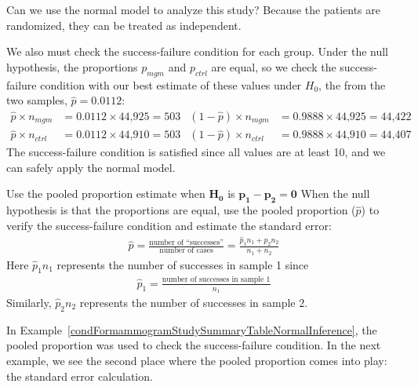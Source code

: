 \begin{examplewrap}
\begin{nexample}{Can we use the normal model to analyze this study?}\label{condFormammogramStudySummaryTableNormalInference}
Because the patients are randomized, they can be treated as independent.

We also must check the success-failure condition for each group. Under the null hypothesis, the proportions $p_{mgm}$ and $p_{ctrl}$ are equal, so we check the success-failure condition with our best estimate of these values under $H_0$, the  from the two samples, $\hat{p} = 0.0112$:
\begin{align*}
\hat{p} \times n_{mgm} &= 0.0112 \times \text{44,925} = 503
	& (1 - \hat{p}) \times n_{mgm} &= 0.9888 \times \text{44,925} = \text{44,422} \\
\hat{p} \times n_{ctrl} &= 0.0112 \times \text{44,910} = 503
	& (1 - \hat{p}) \times n_{ctrl} &= 0.9888 \times \text{44,910} = \text{44,407}
\end{align*}
The success-failure condition is satisfied since all values are at least 10, and we can safely apply the normal model.
\end{nexample}
\end{examplewrap}

\begin{onebox}{Use the pooled proportion estimate when $\mathbf{H_0}$ is $\mathbf{p_1 - p_2 = 0}$}
  When the null hypothesis is that the proportions are equal,
  use the pooled proportion ($\hat{p}$) to verify the
  success-failure condition and estimate the standard error:
  \begin{eqnarray*}
  \hat{p} = \frac{\text{number of ``successes''}}
      {\text{number of cases}}
    = \frac{\hat{p}_1n_1 + \hat{p}_2n_2}{n_1 + n_2}
  \end{eqnarray*}
  Here $\hat{p}_1n_1$ represents the number of successes in
  sample 1 since
  \begin{eqnarray*}
  \hat{p}_1 = \frac{\text{number of successes in sample 1}}{n_1}
  \end{eqnarray*}
  Similarly, $\hat{p}_2n_2$ represents the number of successes
  in sample 2.
\end{onebox}

In Example~\ref{condFormammogramStudySummaryTableNormalInference}, the pooled proportion was used to check the success-failure condition. In the next example, we see the second place where the pooled proportion comes into play: the standard error calculation.

